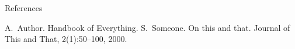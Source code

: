 \documentclass{beamer}
\begin{document}
\appendix

\begin{frame}{References}
  \begin{thebibliography}{10}
      \beamertemplatebookbibitems
        A.~Author.
        \newblock Handbook of Everything.
      \beamertemplatearticlebibitems
        S.~Someone.
        \newblock On this and that.
        \newblock Journal of This and That, 2(1):50--100, 2000.
  \end{thebibliography}
\end{frame}
\end{document}
